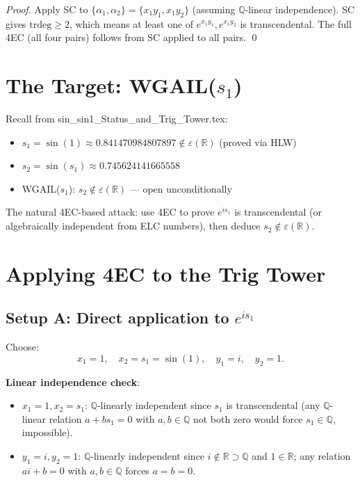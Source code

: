 \documentclass[11pt]{article}
\begin{document}
\begin{proof}
Apply SC to $\{\alpha_1, \alpha_2\} = \{x_1 y_1, x_1 y_2\}$ (assuming $\mathbb{Q}$-linear
independence). SC gives $\mathrm{trdeg} \geq 2$, which means at least one of
$e^{x_1 y_1}, e^{x_1 y_2}$ is transcendental. The full 4EC (all four pairs) follows
from SC applied to all pairs. \qed
\end{proof}

\section{The Target: WGAIL($s_1$)}

Recall from sin\_sin1\_Status\_and\_Trig\_Tower.tex:
\begin{itemize}
  \item $s_1 = \sin(1) \approx 0.841470984807897 \notin \varepsilon(\mathbb{R})$ (proved via HLW)
  \item $s_2 = \sin(s_1) \approx 0.745624141665558$
  \item WGAIL($s_1$): $s_2 \notin \varepsilon(\mathbb{R})$ — open unconditionally
\end{itemize}

The natural 4EC-based attack: use 4EC to prove $e^{is_1}$ is transcendental
(or algebraically independent from ELC numbers), then deduce $s_2 \notin \varepsilon(\mathbb{R})$.

\section{Applying 4EC to the Trig Tower}

\subsection{Setup A: Direct application to $e^{is_1}$}

Choose:
\[
x_1 = 1,\quad x_2 = s_1 = \sin(1),\quad y_1 = i,\quad y_2 = 1.
\]

\textbf{Linear independence check}:
\begin{itemize}
  \item $x_1 = 1, x_2 = s_1$: $\mathbb{Q}$-linearly independent since $s_1$ is
    transcendental (any $\mathbb{Q}$-linear relation $a + b s_1 = 0$ with $a,b \in \mathbb{Q}$
    not both zero would force $s_1 \in \mathbb{Q}$, impossible).
  \item $y_1 = i, y_2 = 1$: $\mathbb{Q}$-linearly independent since $i \notin \mathbb{R} \supset \mathbb{Q}$
    and $1 \in \mathbb{R}$; any relation $ai + b = 0$ with $a,b \in \mathbb{Q}$ forces $a = b = 0$.
\end{itemize}
\end{document}
